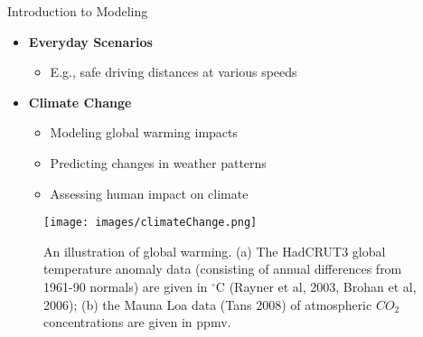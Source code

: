 \documentclass[xcolor=svgnames, t]{beamer}
\theoremstyle{definition}
\theoremstyle{plain}
\theoremstyle{remark}
\begin{document}
\begin{frame}[allowframebreaks]{Introduction to Modeling}
\begin{itemize}
    \item \textbf{Everyday Scenarios}
    \begin{itemize}
        \item E.g., safe driving distances at various speeds
    \end{itemize}
    
    \item \textbf{Climate Change}
    \begin{itemize}
        \item Modeling global warming impacts
        \item Predicting changes in weather patterns
        \item Assessing human impact on climate
    \end{itemize}
\end{itemize}
    \begin{figure}[]
    	\centering
    	\texttt{[image: images/climateChange.png]}
	\caption{An illustration of global warming. (a) The HadCRUT3 global temperature anomaly data (consisting of annual differences from 1961-90 normals) are given in $ ^\circ $C (Rayner et al, 2003, Brohan et al, 2006); (b) the Mauna Loa data (Tans 2008) of atmospheric $ CO_2 $ concentrations are given in ppmv. }
    	\label{fig:images-climateChange-png}
    \end{figure}
\end{frame}
\end{document}
